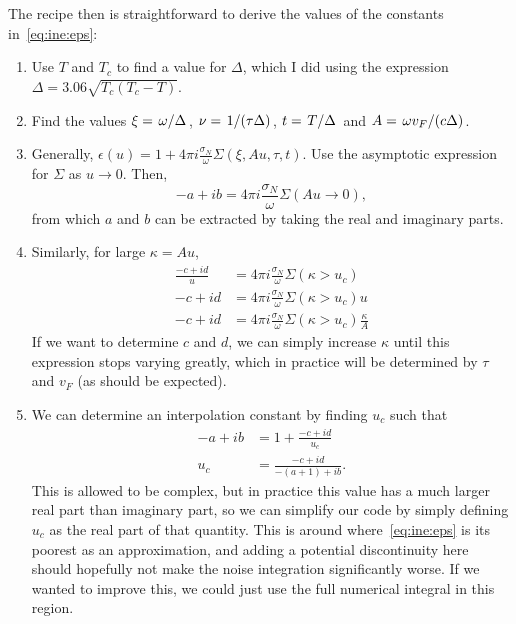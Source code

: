 \documentclass[../main.tex]{subfiles}
\begin{document}
	The recipe then is straightforward to derive the values of the constants in~\eqref{eq:ine:eps}:
	\begin{enumerate}
		\item Use $T$ and $T_c$ to find a value for $\Delta$, which I did using the expression $\Delta = 3.06 \sqrt{T_c(T_c - T)}$.
		\item Find the values $\xi = \flatfrac{\omega}{\Delta}$, $\nu = \flatfrac{1}{(\tau \Delta)}$,  $t = \flatfrac{T}{\Delta}$ and $A = \flatfrac{\omega v_F}{(c \Delta)}$.
		\item Generally, $\epsilon(u) = 1 + 4 \pi i \frac{\sigma_N}{\omega} \Sigma(\xi, A u, \tau, t)$.
			Use the asymptotic expression for $\Sigma$ as $u \rightarrow 0$.
			Then,
			\begin{equation}
				-a + ib = 4 \pi i \frac{\sigma_N}{\omega} \Sigma(A u \rightarrow 0),
			\end{equation}
			from which $a$ and $b$ can be extracted by taking the real and imaginary parts.
		\item Similarly, for large $\kappa = A u$,
			\begin{align}
				\frac{-c + i d}{u} &= 4 \pi i \frac{\sigma_N}{\omega} \Sigma(\kappa > u_c) \\
				- c + i d &= 4 \pi i \frac{\sigma_N}{\omega} \Sigma(\kappa > u_c) u \\
				- c + i d &= 4 \pi i \frac{\sigma_N}{\omega} \Sigma(\kappa > u_c) \frac{\kappa}{A}
			\end{align}
			If we want to determine $c$ and $d$, we can simply increase $\kappa$ until this expression stops varying greatly, which in practice will be determined by $\tau$ and $v_F$ (as should be expected).
		\item We can determine an interpolation constant by finding $u_c$ such that
			\begin{align}
				-a + ib &= 1 + \frac{-c + id}{u_c} \\
				u_c &= \frac{-c + id}{-(a + 1) + ib}.
			\end{align}
			This is allowed to be complex, but in practice this value has a much larger real part than imaginary part, so we can simplify our code by simply defining $u_c$ as the real part of that quantity.
			This is around where~\eqref{eq:ine:eps} is its poorest as an approximation, and adding a potential discontinuity here should hopefully not make the noise integration significantly worse.
			If we wanted to improve this, we could just use the full numerical integral in this region.
	\end{enumerate}
\end{document}
